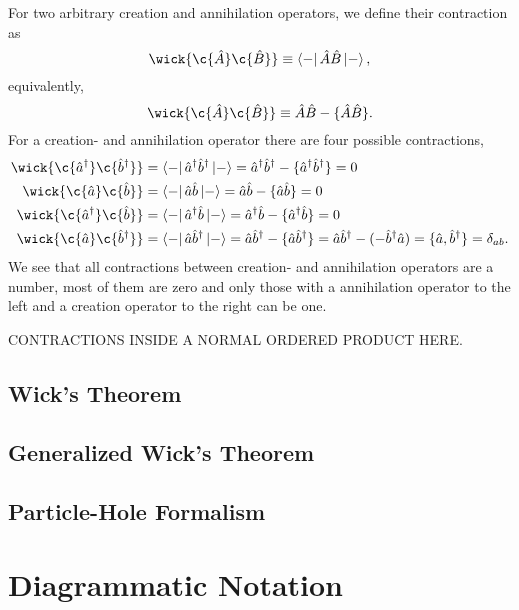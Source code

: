         For two arbitrary creation and annihilation operators, we define their contraction
        as 
        \begin{equation}
            \wick{\c {\hat{A}} \c {\hat{B}} } \equiv \bra{-} \hat{A} \hat{B}\ket{-},
        \end{equation}
        equivalently,
        \begin{equation}
            \wick{\c {\hat{A}} \c {\hat{B}} } \equiv \hat{A}\hat{B} - \{\hat{A} \hat{B}\}.
        \end{equation}
        For a creation- and annihilation operator there are four possible contractions,
        \begin{equation}
            \begin{aligned}
            \wick{\c{\hat{a}^\dagger} \c{\hat{b}^\dagger}} 
            &= \bra{-}\hat{a}^\dagger \hat{b}^\dagger \ket{-}
            = \hat{a}^\dagger \hat{b}^\dagger - \{\hat{a}^\dagger \hat{b}^\dagger\}
            = 0 \\
            \wick{\c{\hat{a}} \c{\hat{b}}} 
            &= \bra{-}\hat{a} \hat{b} \ket{-}
            = \hat{a} \hat{b} - \{\hat{a} \hat{b}\}
            = 0 \\
            \wick{\c{\hat{a}^\dagger} \c{\hat{b}}} 
            &= \bra{-}\hat{a}^\dagger \hat{b} \ket{-}
            = \hat{a}^\dagger \hat{b} - \{\hat{a}^\dagger \hat{b}\}
            = 0 \\
            \wick{\c{\hat{a}} \c{\hat{b}^\dagger}} 
            &= \bra{-}\hat{a} \hat{b}^\dagger \ket{-}
            = \hat{a} \hat{b}^\dagger - \{\hat{a} \hat{b}^\dagger\}
            = \hat{a} \hat{b}^\dagger - (- \hat{b}^\dagger\hat{a})
            = \{\hat{a}, \hat{b}^\dagger \} = \delta_{ab}.
            \end{aligned}
        \end{equation}
        We see that all contractions between creation- and annihilation operators
        are a number, most of them are zero and only those with a annihilation operator
        to the left and a creation operator to the right can be one.
       
        CONTRACTIONS INSIDE A NORMAL ORDERED PRODUCT HERE.

        \subsection{Wick's Theorem}

        \subsection{Generalized Wick's Theorem}

        \subsection{Particle-Hole Formalism}

\section{Diagrammatic Notation}
